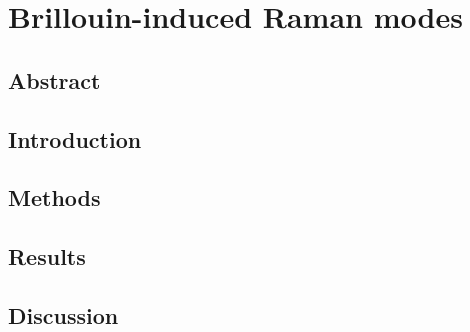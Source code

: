 \setcounter{rownumber}{0}
\singlespacing
\chapter{Brillouin-induced Raman modes}
\label{ch:Raman}
\acresetall


%

%

\doublespacing


\section{Abstract}
\label{sec:Raman:Abstract}


\section{Introduction}
\label{sec:Raman:Introduction}


\section{Methods}
\label{sec:Raman:Methods}


\section{Results}
\label{sec:Raman:Results}


\section{Discussion}
\label{sec:Raman:Discussion}
